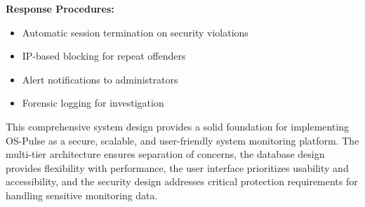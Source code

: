 \textbf{Response Procedures:}
\begin{itemize}
    \item Automatic session termination on security violations
    \item IP-based blocking for repeat offenders
    \item Alert notifications to administrators
    \item Forensic logging for investigation
\end{itemize}

This comprehensive system design provides a solid foundation for implementing OS-Pulse as a secure, scalable, and user-friendly system monitoring platform. The multi-tier architecture ensures separation of concerns, the database design provides flexibility with performance, the user interface prioritizes usability and accessibility, and the security design addresses critical protection requirements for handling sensitive monitoring data.